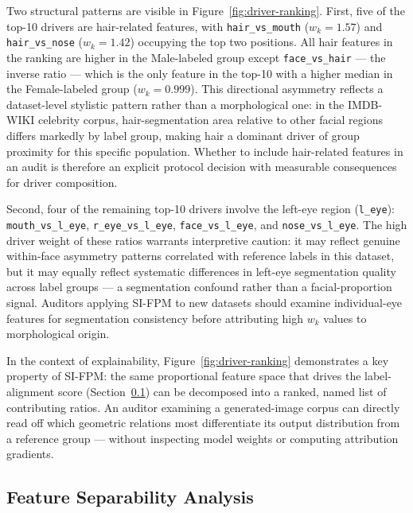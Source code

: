 \documentclass{article}
\begin{document}
Two structural patterns are visible in Figure~\ref{fig:driver-ranking}. First, five of the top-10 drivers are hair-related features, with \texttt{hair\_vs\_mouth} ($w_k = 1.57$) and \texttt{hair\_vs\_nose} ($w_k = 1.42$) occupying the top two positions. All hair features in the ranking are higher in the Male-labeled group except \texttt{face\_vs\_hair} — the inverse ratio — which is the only feature in the top-10 with a higher median in the Female-labeled group ($w_k = 0.999$). This directional asymmetry reflects a dataset-level stylistic pattern rather than a morphological one: in the IMDB-WIKI celebrity corpus, hair-segmentation area relative to other facial regions differs markedly by label group, making hair a dominant driver of group proximity for this specific population. Whether to include hair-related features in an audit is therefore an explicit protocol decision with measurable consequences for driver composition.

Second, four of the remaining top-10 drivers involve the left-eye region (\texttt{l\_eye}): \texttt{mouth\_vs\_l\_eye}, \texttt{r\_eye\_vs\_l\_eye}, \texttt{face\_vs\_l\_eye}, and \texttt{nose\_vs\_l\_eye}. The high driver weight of these ratios warrants interpretive caution: it may reflect genuine within-face asymmetry patterns correlated with reference labels in this dataset, but it may equally reflect systematic differences in left-eye segmentation quality across label groups — a segmentation confound rather than a facial-proportion signal. Auditors applying SI-FPM to new datasets should examine individual-eye features for segmentation consistency before attributing high $w_k$ values to morphological origin.

In the context of explainability, Figure~\ref{fig:driver-ranking} demonstrates a key property of SI-FPM: the same proportional feature space that drives the label-alignment score (Section~\ref{classification_eval}) can be decomposed into a ranked, named list of contributing ratios. An auditor examining a generated-image corpus can directly read off which geometric relations most differentiate its output distribution from a reference group — without inspecting model weights or computing attribution gradients.

\subsection{Feature Separability Analysis}
\label{classification_eval}
\end{document}
